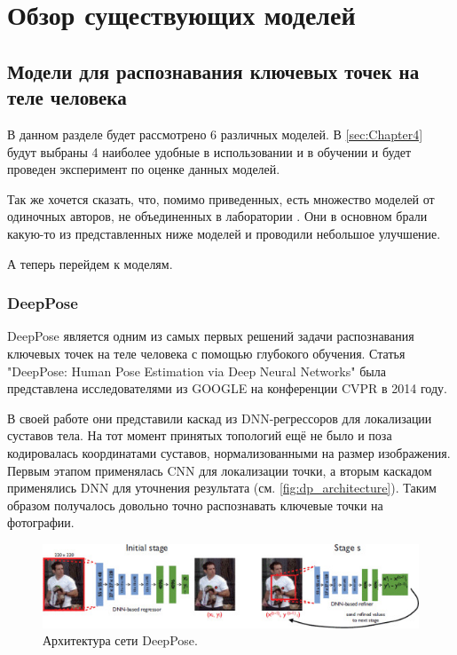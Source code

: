\section{Обзор существующих моделей}
\label{sec:Chapter2} 

\subsection{Модели для распознавания ключевых точек на теле человека}
\label{subsec:pose_estimation_models}

В данном разделе будет рассмотрено 6 различных моделей. В \autoref{sec:Chapter4} будут выбраны 4 наиболее удобные в использовании и в обучении и будет проведен эксперимент по оценке данных моделей.

Так же хочется сказать, что, помимо приведенных, есть множество моделей от одиночных авторов, не объединенных в лаборатории \cite{pet_recognition, pet_classification}. Они в основном брали какую-то из представленных ниже моделей и проводили небольшое улучшение.

А теперь перейдем к моделям.

\subsubsection{DeepPose}
\label{subsubsec:deeppose_desc}

DeepPose является одним из самых первых решений задачи распознавания ключевых точек на теле человека с помощью глубокого обучения. Статья "DeepPose: Human Pose Estimation via Deep Neural Networks"{} \cite{DeepPose} была представлена исследователями из GOOGLE на конференции CVPR в 2014 году.

В своей работе они представили каскад из DNN-регрессоров для локализации суставов тела. На тот момент принятых топологий ещё не было и поза кодировалась координатами суставов, нормализованными на размер изображения.
Первым этапом применялась CNN для локализации точки, а вторым каскадом применялись DNN для уточнения результата (см. \autoref{fig:dp_architecture}). Таким образом получалось довольно точно распознавать ключевые точки на фотографии.

\begin{figure}[h]
	\centering
	\includegraphics[width=\textwidth]{./images/DeepPose}
	\caption{Архитектура сети DeepPose. \cite{DeepPose}}
	\label{fig:dp_architecture}
\end{figure}



